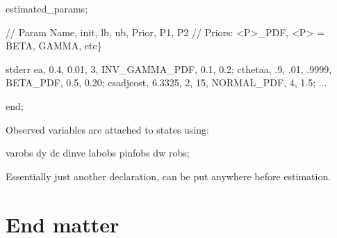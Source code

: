 \documentclass[
  letterpaper,
]{book}
\newenvironment{Shaded}{\begin{snugshade}}{\end{snugshade}}
\newcommand{\FloatTok}[1]{\textcolor[rgb]{0.68,0.00,0.00}{#1}}
\newcommand{\KeywordTok}[1]{\textcolor[rgb]{0.00,0.23,0.31}{#1}}
\newcommand{\NormalTok}[1]{\textcolor[rgb]{0.00,0.23,0.31}{#1}}
\newcommand{\OperatorTok}[1]{\textcolor[rgb]{0.37,0.37,0.37}{#1}}
\newcommand{\VariableTok}[1]{\textcolor[rgb]{0.07,0.07,0.07}{#1}}
\begin{document}
\begin{Shaded}
\begin{Highlighting}[]
\VariableTok{estimated\_params}\OperatorTok{;}

    \OperatorTok{//} \VariableTok{Param} \VariableTok{Name}\OperatorTok{,} \VariableTok{init}\OperatorTok{,} \VariableTok{lb}\OperatorTok{,} \VariableTok{ub}\OperatorTok{,} \VariableTok{Prior}\OperatorTok{,} \VariableTok{P1}\OperatorTok{,} \VariableTok{P2}
    \OperatorTok{//} \VariableTok{Priors}\OperatorTok{:} \OperatorTok{\textless{}}\VariableTok{P}\OperatorTok{\textgreater{}}\NormalTok{\_}\VariableTok{PDF}\OperatorTok{,} \OperatorTok{\textless{}}\VariableTok{P}\OperatorTok{\textgreater{}} \OperatorTok{=} \VariableTok{BETA}\OperatorTok{,} \VariableTok{GAMMA}\OperatorTok{,} \VariableTok{etc}\NormalTok{\}}

    \VariableTok{stderr} \VariableTok{ea}\OperatorTok{,} \FloatTok{0.4}\OperatorTok{,} \FloatTok{0.01}\OperatorTok{,} \FloatTok{3}\OperatorTok{,} \VariableTok{INV\_GAMMA\_PDF}\OperatorTok{,} \FloatTok{0.1}\OperatorTok{,} \FloatTok{0.2}\OperatorTok{;}
    \VariableTok{cthetaa}\OperatorTok{,} \FloatTok{.9}\OperatorTok{,} \FloatTok{.01}\OperatorTok{,} \FloatTok{.9999}\OperatorTok{,} \VariableTok{BETA\_PDF}\OperatorTok{,} \FloatTok{0.5}\OperatorTok{,} \FloatTok{0.20}\OperatorTok{;}
    \VariableTok{csadjcost}\OperatorTok{,} \FloatTok{6.3325}\OperatorTok{,} \FloatTok{2}\OperatorTok{,} \FloatTok{15}\OperatorTok{,} \VariableTok{NORMAL\_PDF}\OperatorTok{,} \FloatTok{4}\OperatorTok{,} \FloatTok{1.5}\OperatorTok{;}
    \OperatorTok{...}

\KeywordTok{end}\OperatorTok{;}
\end{Highlighting}
\end{Shaded}

Observed variables are attached to states using:

\begin{Shaded}
\begin{Highlighting}[]
\VariableTok{varobs} \VariableTok{dy} \VariableTok{dc} \VariableTok{dinve} \VariableTok{labobs} \VariableTok{pinfobs} \VariableTok{dw} \VariableTok{robs}\OperatorTok{;}
\end{Highlighting}
\end{Shaded}

Essentially just another declaration, can be put anywhere before
estimation.

\part{End matter}
\end{document}
